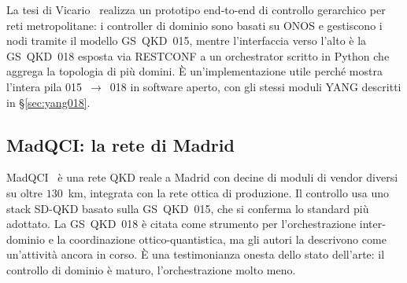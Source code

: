 La tesi di Vicario~\cite{vicario2025} realizza un prototipo end-to-end di
controllo gerarchico per reti metropolitane: i controller di dominio sono
basati su ONOS e gestiscono i nodi tramite il modello GS~QKD~015, mentre
l'interfaccia verso l'alto è la GS~QKD~018 esposta via RESTCONF a un
orchestrator scritto in Python che aggrega la topologia di più domini. È
un'implementazione utile perché mostra l'intera pila
015~$\to$~018 in software aperto, con gli stessi moduli YANG descritti in
§\ref{sec:yang018}.

\subsection{MadQCI: la rete di Madrid}

MadQCI~\cite{madqci2024} è una rete QKD reale a Madrid con decine di moduli
di vendor diversi su oltre $130$~km, integrata con la rete ottica di
produzione. Il controllo usa uno stack SD-QKD basato sulla GS~QKD~015, che
si conferma lo standard più adottato. La GS~QKD~018 è citata come strumento
per l'orchestrazione inter-dominio e la coordinazione ottico-quantistica, ma
gli autori la descrivono come un'attività ancora in corso. È una
testimonianza onesta dello stato dell'arte: il controllo di dominio è
maturo, l'orchestrazione molto meno.
